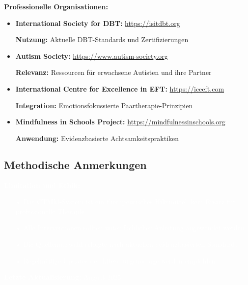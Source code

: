 \begin{ctmmPurpleBox}[title=Verlässliche digitale Quellen]

\textbf{Professionelle Organisationen:}
\begin{itemize}
    \item \textbf{International Society for DBT:} \url{https://isitdbt.org}
    
    \textbf{Nutzung:} Aktuelle DBT-Standards und Zertifizierungen
    
    \item \textbf{Autism Society:} \url{https://www.autism-society.org}
    
    \textbf{Relevanz:} Ressourcen für erwachsene Autisten und ihre Partner
    
    \item \textbf{International Centre for Excellence in EFT:} \url{https://iceeft.com}
    
    \textbf{Integration:} Emotionsfokussierte Paartherapie-Prinzipien
    
    \item \textbf{Mindfulness in Schools Project:} \url{https://mindfulnessinschools.org}
    
    \textbf{Anwendung:} Evidenzbasierte Achtsamkeitspraktiken
\end{itemize}

\end{ctmmPurpleBox}

\subsection{Methodische Anmerkungen}

\begin{ctmmRedBox}[title=\textcolor{white}{Wichtige Hinweise zur Quellenverwendung}]

\textcolor{white}{\textbf{Limitation und Ethik:}}

\begin{itemize}
    \item[\textcolor{white}{•}] \textcolor{white}{Das CTMM-System ist ein therapeutisches Hilfsmittel, kein Ersatz für professionelle Therapie}
    \item[\textcolor{white}{•}] \textcolor{white}{Alle Interventionen sollten unter fachlicher Anleitung angewendet werden}
    \item[\textcolor{white}{•}] \textcolor{white}{Die Quellenauswahl erfolgte nach aktuellen evidenzbasierten Standards}
    \item[\textcolor{white}{•}] \textcolor{white}{Regelmäßige Updates der Literaturgrundlage werden empfohlen}
\end{itemize}

\textcolor{white}{\textbf{Letzte Aktualisierung:} August 2025}

\end{ctmmRedBox}

